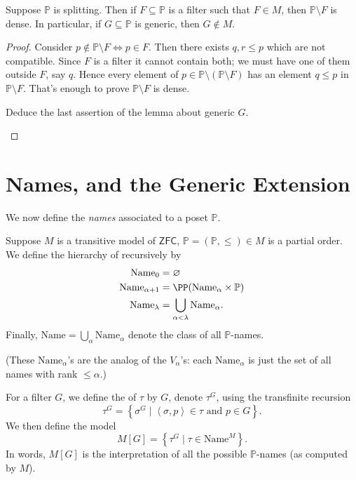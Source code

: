 \documentclass[11pt]{scrreprt}
\newcommand{\ZFC}{\mathsf{ZFC}}
\newcommand{\Name}{\text{Name}}
\newcommand{\Po}{\mathbb P}
\newcommand{\nrank}{\opname{n-rank}} %
\begin{document}
\begin{lemma}
	Suppose $\Po$ is splitting.  Then if $F \subseteq \Po$ is a filter
	such that $F \in M$, then $\Po \setminus F$ is dense.
	In particular, if $G \subseteq \Po$ is generic, then $G \notin M$.
\end{lemma}
\begin{proof}
	Consider $p \notin \Po \setminus F \iff p \in F$.
	Then there exists $q, r \le p$ which are not compatible.
	Since $F$ is a filter it cannot contain both;
	we must have one of them outside $F$, say $q$.
	Hence every element of $p \in \Po \setminus (\Po \setminus F)$
	has an element $q \le p$ in $\Po \setminus F$.
	That's enough to prove $\Po \setminus F$ is dense.
	\begin{ques}
		Deduce the last assertion of the lemma about generic $G$. \qedhere
	\end{ques}
\end{proof}

\section{Names, and the Generic Extension}
We now define the \emph{names} associated to a poset $\Po$.

\begin{definition}
	Suppose $M$ is a transitive model of $\ZFC$, $\Po = (\Po, \le) \in M$ is a partial order.
	We define the hierarchy of \vocab{$\Po$-names} recursively by
	\begin{align*}
		\Name_0 &= \varnothing \\
		\Name_{\alpha+1} &= \PP(\Name_\alpha \times \Po) \\
		\Name_{\lambda} &= \bigcup_{\alpha < \lambda} \Name_\alpha.
	\end{align*}
	Finally, $\Name = \bigcup_\alpha \Name_\alpha$ denote the class of all $\Po$-names.
\end{definition}
(These $\Name_\alpha$'s are the analog of the $V_\alpha$'s:
each $\Name_\alpha$ is just the set of all names with rank $\le \alpha$.)

\begin{definition}
	For a filter $G$, we define the  of $\tau$ by $G$,
	denote $\tau^G$, using the transfinite recursion
	\[ \tau^G
		= \left\{ \sigma^G
		\mid \left<\sigma, p\right> \in \tau
		\text{ and } p \in G\right\}. \]
	We then define the model
	\[ M[G] = \left\{ \tau^G \mid \tau \in \Name^M \right\}. \]
	In words, $M[G]$ is the interpretation of all the possible $\Po$-names
	(as computed by $M$).
\end{definition}
\end{document}

